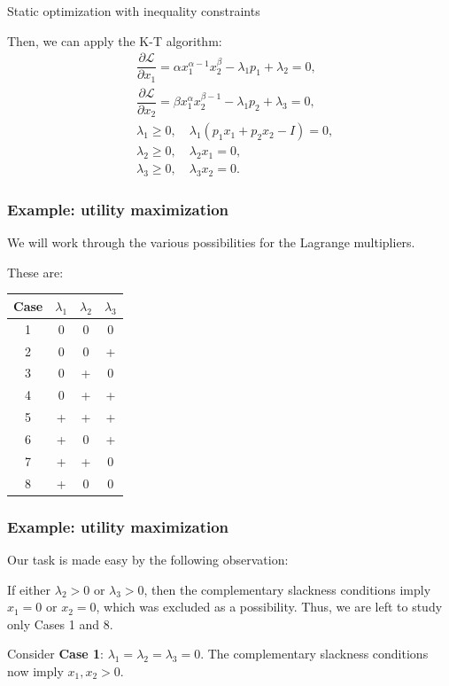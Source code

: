 \documentclass[10pt]{beamer}
\theoremstyle{definition}
\begin{document}
\begin{section}{Static optimization with inequality constraints}
\begin{frame}[fragile]
Then, we can apply the K-T algorithm:\begin{align*}
&\dfrac{\partial \mathcal{L}}{\partial x_1} = \alpha x_1^{\alpha-1} x_2^\beta -\lambda_1 p_1 + \lambda_2 = 0, \\[4pt]
&\dfrac{\partial \mathcal{L}}{\partial x_2} = \beta x_1^\alpha x_2^{\beta-1} -\lambda_1 p_2 + \lambda_3 = 0, \\[4pt]
&\lambda_1 \geq 0, \quad \lambda_1 ( p_1 x_1 + p_2 x_2 - I) = 0, \\[4pt]
&\lambda_2 \geq 0, \quad \lambda_2 x_1 = 0, \\[4pt]
&\lambda_3 \geq 0, \quad \lambda_3 x_2 = 0. 
\end{align*}
\end{frame}

\begin{frame}[fragile]
\frametitle{Example: utility maximization}
We will work through the various possibilities for the Lagrange multipliers. 

These are:

\begin{center}
\begin{tabular}{|c|c|c|c|}
\hline 
Case & $ \lambda_1 $ & $ \lambda_2 $ & $ \lambda_3 $ \\ 
\hline 
1 & 0 & 0 & 0 \\ 
\hline 
2 & 0 & 0 & + \\ 
\hline 
3 & 0 & + & 0 \\ 
\hline 
4 & 0 & + & + \\ 
\hline 
5 & + & + & + \\ 
\hline 
6 & + & 0 & + \\ 
\hline 
7 & + & + & 0 \\ 
\hline 
8 & + & 0 & 0 \\ 
\hline 
\end{tabular} \end{center}
\end{frame}

\begin{frame}[fragile]
\frametitle{Example: utility maximization}
Our task is made easy by the following observation:\bigskip

If either $ \lambda_2>0 $ or $ \lambda_3>0 $, then the complementary slackness conditions imply $ x_1=0 $ or $ x_2=0 $, which was excluded as a possibility. Thus, we are left to study only Cases 1 and 8.\bigskip

Consider \textbf{Case 1}: $ \lambda_1=\lambda_2=\lambda_3=0 $. The complementary slackness conditions now imply $ x_1,x_2>0 $.


\end{frame}
\end{section}
\end{document}
